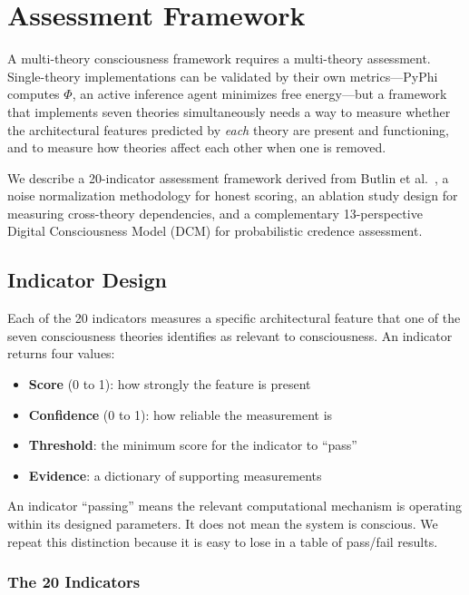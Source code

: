 \section{Assessment Framework}
\label{sec:assessment}

A multi-theory consciousness framework requires a multi-theory assessment. Single-theory implementations can be validated by their own metrics---PyPhi computes $\Phi$, an active inference agent minimizes free energy---but a framework that implements seven theories simultaneously needs a way to measure whether the architectural features predicted by \textit{each} theory are present and functioning, and to measure how theories affect each other when one is removed.

We describe a 20-indicator assessment framework derived from Butlin et al.\ \cite{butlin2023}, a noise normalization methodology for honest scoring, an ablation study design for measuring cross-theory dependencies, and a complementary 13-perspective Digital Consciousness Model (DCM) for probabilistic credence assessment.

\subsection{Indicator Design}

Each of the 20 indicators measures a specific architectural feature that one of the seven consciousness theories identifies as relevant to consciousness. An indicator returns four values:

\begin{itemize}
    \item \textbf{Score} (0 to 1): how strongly the feature is present
    \item \textbf{Confidence} (0 to 1): how reliable the measurement is
    \item \textbf{Threshold}: the minimum score for the indicator to ``pass''
    \item \textbf{Evidence}: a dictionary of supporting measurements
\end{itemize}

An indicator ``passing'' means the relevant computational mechanism is operating within its designed parameters. It does not mean the system is conscious. We repeat this distinction because it is easy to lose in a table of pass/fail results.

\subsubsection{The 20 Indicators}

